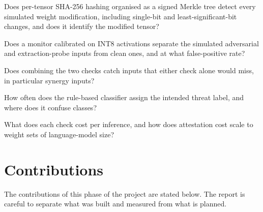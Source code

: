 \begin{description}[leftmargin=*,style=nextline]
  \item[RQ1 — Weight integrity.] Does per-tensor SHA-256 hashing organised as a signed Merkle
        tree detect every simulated weight modification, including single-bit and
        least-significant-bit changes, and does it identify the modified tensor?
  \item[RQ2 — Activation anomalies.] Does a monitor calibrated on INT8 activations separate the
        simulated adversarial and extraction-probe inputs from clean ones, and at what
        false-positive rate?
  \item[RQ3 — Complementarity.] Does combining the two checks catch inputs that either check
        alone would miss, in particular synergy inputs?
  \item[RQ4 — Labelling.] How often does the rule-based classifier assign the intended threat
        label, and where does it confuse classes?
  \item[RQ5 — Cost.] What does each check cost per inference, and how does attestation cost
        scale to weight sets of language-model size?
\end{description}

\section{Contributions}

The contributions of this phase of the project are stated below. The report is careful to
separate what was built and measured from what is planned.

